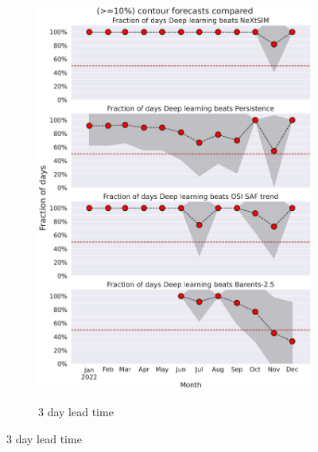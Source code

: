 \documentclass[../main/thesis.tex]{subfiles}
\begin{document}
\begin{figure}
\begin{subfigure}{0.32\textwidth}
        \includegraphics[width=\textwidth]{days_beat_weights_21021550.pdf}
    \end{subfigure}
    \begin{subfigure}{0.32\textwidth}
        \caption{3 day lead time}

\end{subfigure}
\end{figure}
\end{document}
